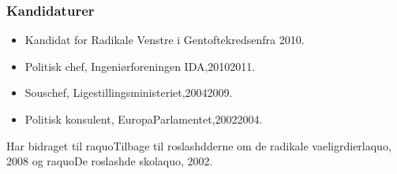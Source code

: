 \documentclass[11pt, a4paper]{awesome-cv}
\begin{document}
\begin{cvletter}
\subsubsection*{Kandidaturer}
\begin{itemize}
\item Kandidat for Radikale Venstre i Gentoftekredsenfra 2010.
\end{itemize}
\begin{itemize}
\item Politisk chef, Ingeniørforeningen IDA,20102011.
\item Souschef, Ligestillingsministeriet,20042009.
\item Politisk konsulent, EuropaParlamentet,20022004.
\end{itemize}
Har bidraget til raquoTilbage til roslashdderne  om de radikale vaeligrdierlaquo, 2008 og raquoDe roslashde skolaquo, 2002.

\end{cvletter}
\end{document}
